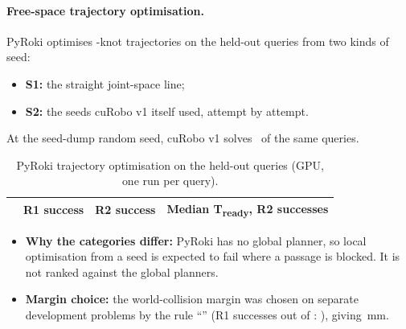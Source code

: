 \documentclass[11pt]{article}
\begin{document}
\paragraph{Free-space trajectory optimisation.} PyRoki optimises \pyKnots-knot trajectories on the held-out queries from two kinds of seed:
\begin{itemize}
  \item \textbf{S1:} the straight joint-space line;
  \item \textbf{S2:} the seeds cuRobo v1 itself used, attempt by attempt.
\end{itemize}
At the seed-dump random seed, cuRobo v1 solves \vOneSeedDump\ of the same queries.
\begin{table}[ht]\centering\footnotesize
\caption{PyRoki trajectory optimisation on the held-out queries (GPU, one run per query).}\label{tab:trajopt}
\begin{tabular}{@{}l ccc@{}}\toprule
 & R1 success & R2 success & Median T\textsubscript{ready}, R2 successes \\\midrule
\end{tabular}
\end{table}
\begin{itemize}
  \item \textbf{Why the categories differ:} PyRoki has no global planner, so local optimisation from a seed is expected to fail where a passage is blocked. It is not ranked against the global planners.
  \item \textbf{Margin choice:} the world-collision margin was chosen on separate development problems by the rule ``\marginRule'' (R1 successes out of \marginQueries: \marginList), giving \marginChosen\,mm.
\end{itemize}
\end{document}
